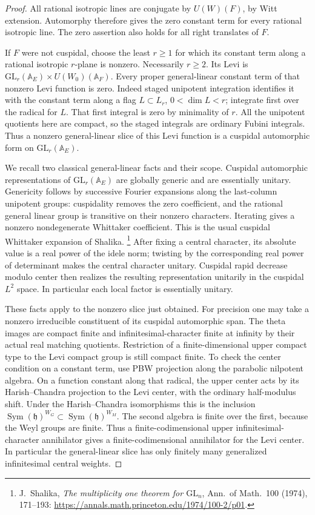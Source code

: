 \begin{proof}
All rational isotropic lines are conjugate by \(U(W)(F)\),
by Witt extension. Automorphy therefore gives the zero constant
term for every rational isotropic line. The zero assertion
also holds for all right translates of \(F\).

If \(F\) were not cuspidal, choose the least \(r\ge1\) for
which its constant term along a rational isotropic \(r\)-plane
is nonzero. Necessarily \(r\ge2\).
Its Levi is
\(\mathrm{GL}_r(\mathbb A_E)\times U(W_0)(\mathbb A_F)\).
Every proper general-linear constant term of that nonzero
Levi function is zero. Indeed staged unipotent integration
identifies it with the constant term along a flag
\(L\subset L_r\), \(0<\dim L<r\); integrate first over
the radical for \(L\). That first integral is zero by
minimality of \(r\). All the unipotent quotients here are
compact, so the staged integrals are ordinary Fubini integrals.
Thus a nonzero general-linear slice of this Levi function
is a cuspidal automorphic form on \(\mathrm{GL}_r(\mathbb A_E)\).

We recall two classical general-linear facts and their scope.
Cuspidal automorphic representations of
\(\mathrm{GL}_r(\mathbb A_E)\) are globally generic and are
essentially unitary. Genericity follows by successive
Fourier expansions along the last-column unipotent groups:
cuspidality removes the zero coefficient, and the rational
general linear group is transitive on their nonzero
characters. Iterating gives a nonzero nondegenerate Whittaker
coefficient. This is the usual cuspidal Whittaker expansion
of Shalika.
\footnote{J.~Shalika, \emph{The multiplicity one theorem for
\(\mathrm{GL}_n\)}, Ann.~of Math.~100 (1974), 171--193:
\url{https://annals.math.princeton.edu/1974/100-2/p01}.}
After fixing a central character, its absolute value is a real
power of the idele norm; twisting by the corresponding real
power of determinant makes the central character unitary.
Cuspidal rapid decrease modulo center then realizes the
resulting representation unitarily in the cuspidal \(L^2\)
space. In particular each local factor is essentially unitary.

These facts apply to the nonzero slice just obtained.
For precision one may take a nonzero irreducible constituent
of its cuspidal automorphic span. The theta images are compact
finite and infinitesimal-character finite at infinity by
their actual real matching quotients. Restriction of a
finite-dimensional upper compact type to the Levi compact
group is still compact finite. To check the center condition
on a constant term, use PBW projection along the parabolic
nilpotent algebra. On a function constant along that radical,
the upper center acts by its Harish--Chandra projection to
the Levi center, with the ordinary half-modulus shift.
Under the Harish--Chandra isomorphisms this is the inclusion
\(\operatorname{Sym}(\mathfrak h)^{W_G}
  \subset\operatorname{Sym}(\mathfrak h)^{W_M}\).
The second algebra is finite over the first, because the
Weyl groups are finite. Thus a finite-codimensional
upper infinitesimal-character annihilator gives a
finite-codimensional annihilator for the Levi center.
In particular the general-linear slice has only finitely
many generalized infinitesimal central weights.


\end{proof}
